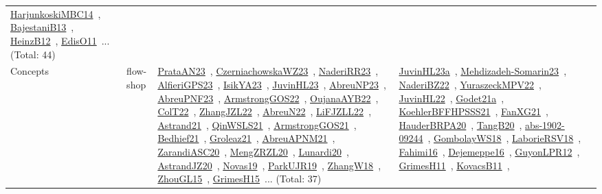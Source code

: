 {\begin{longtable}{lp{3cm}>{\raggedright\arraybackslash}p{6cm}>{\raggedright\arraybackslash}p{6cm}>{\raggedright\arraybackslash}p{8cm}}
\href{works/HarjunkoskiMBC14.pdf}{HarjunkoskiMBC14}~\cite{HarjunkoskiMBC14}, \href{works/BajestaniB13.pdf}{BajestaniB13}~\cite{BajestaniB13}, \href{works/HeinzB12.pdf}{HeinzB12}~\cite{HeinzB12}, \href{works/EdisO11.pdf}{EdisO11}~\cite{EdisO11}... (Total: 44)\\
Concepts & flow-shop & \href{works/PrataAN23.pdf}{PrataAN23}~\cite{PrataAN23}, \href{works/CzerniachowskaWZ23.pdf}{CzerniachowskaWZ23}~\cite{CzerniachowskaWZ23}, \href{works/NaderiRR23.pdf}{NaderiRR23}~\cite{NaderiRR23}, \href{works/AlfieriGPS23.pdf}{AlfieriGPS23}~\cite{AlfieriGPS23}, \href{works/IsikYA23.pdf}{IsikYA23}~\cite{IsikYA23}, \href{works/JuvinHL23.pdf}{JuvinHL23}~\cite{JuvinHL23}, \href{works/AbreuNP23.pdf}{AbreuNP23}~\cite{AbreuNP23}, \href{works/AbreuPNF23.pdf}{AbreuPNF23}~\cite{AbreuPNF23}, \href{works/ArmstrongGOS22.pdf}{ArmstrongGOS22}~\cite{ArmstrongGOS22}, \href{works/OujanaAYB22.pdf}{OujanaAYB22}~\cite{OujanaAYB22}, \href{works/ColT22.pdf}{ColT22}~\cite{ColT22}, \href{works/ZhangJZL22.pdf}{ZhangJZL22}~\cite{ZhangJZL22}, \href{works/AbreuN22.pdf}{AbreuN22}~\cite{AbreuN22}, \href{works/LiFJZLL22.pdf}{LiFJZLL22}~\cite{LiFJZLL22}, \href{works/Astrand21.pdf}{Astrand21}~\cite{Astrand21}, \href{works/QinWSLS21.pdf}{QinWSLS21}~\cite{QinWSLS21}, \href{works/ArmstrongGOS21.pdf}{ArmstrongGOS21}~\cite{ArmstrongGOS21}, \href{works/Bedhief21.pdf}{Bedhief21}~\cite{Bedhief21}, \href{works/Groleaz21.pdf}{Groleaz21}~\cite{Groleaz21}, \href{works/AbreuAPNM21.pdf}{AbreuAPNM21}~\cite{AbreuAPNM21}, \href{works/ZarandiASC20.pdf}{ZarandiASC20}~\cite{ZarandiASC20}, \href{works/MengZRZL20.pdf}{MengZRZL20}~\cite{MengZRZL20}, \href{works/Lunardi20.pdf}{Lunardi20}~\cite{Lunardi20}, \href{works/AstrandJZ20.pdf}{AstrandJZ20}~\cite{AstrandJZ20}, \href{works/Novas19.pdf}{Novas19}~\cite{Novas19}, \href{works/ParkUJR19.pdf}{ParkUJR19}~\cite{ParkUJR19}, \href{works/ZhangW18.pdf}{ZhangW18}~\cite{ZhangW18}, \href{works/ZhouGL15.pdf}{ZhouGL15}~\cite{ZhouGL15}, \href{works/GrimesH15.pdf}{GrimesH15}~\cite{GrimesH15}... (Total: 37) & \href{works/JuvinHL23a.pdf}{JuvinHL23a}~\cite{JuvinHL23a}, \href{works/Mehdizadeh-Somarin23.pdf}{Mehdizadeh-Somarin23}~\cite{Mehdizadeh-Somarin23}, \href{works/NaderiBZ22.pdf}{NaderiBZ22}~\cite{NaderiBZ22}, \href{works/YuraszeckMPV22.pdf}{YuraszeckMPV22}~\cite{YuraszeckMPV22}, \href{works/JuvinHL22.pdf}{JuvinHL22}~\cite{JuvinHL22}, \href{works/Godet21a.pdf}{Godet21a}~\cite{Godet21a}, \href{works/KoehlerBFFHPSSS21.pdf}{KoehlerBFFHPSSS21}~\cite{KoehlerBFFHPSSS21}, \href{works/FanXG21.pdf}{FanXG21}~\cite{FanXG21}, \href{works/HauderBRPA20.pdf}{HauderBRPA20}~\cite{HauderBRPA20}, \href{works/TangB20.pdf}{TangB20}~\cite{TangB20}, \href{works/abs-1902-09244.pdf}{abs-1902-09244}~\cite{abs-1902-09244}, \href{works/GombolayWS18.pdf}{GombolayWS18}~\cite{GombolayWS18}, \href{works/LaborieRSV18.pdf}{LaborieRSV18}~\cite{LaborieRSV18}, \href{works/Fahimi16.pdf}{Fahimi16}~\cite{Fahimi16}, \href{works/Dejemeppe16.pdf}{Dejemeppe16}~\cite{Dejemeppe16}, \href{works/GuyonLPR12.pdf}{GuyonLPR12}~\cite{GuyonLPR12}, \href{works/GrimesH11.pdf}{GrimesH11}~\cite{GrimesH11}, \href{works/KovacsB11.pdf}{KovacsB11}~\cite{KovacsB11}, 
\end{longtable}}
